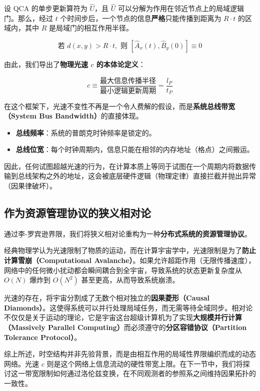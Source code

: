 设 QCA 的单步更新算符为 $\hat{U}$，且 $\hat{U}$ 可以分解为作用在邻近节点上的局域逻辑门。那么，经过 $t$ 个时间步后，一个节点的信息\textbf{严格}只能传播到距离为 $R \cdot t$ 的区域内，其中 $R$ 是局域门的相互作用半径。

\begin{equation}
\text{若 } d(x,y) > R \cdot t, \text{ 则 } [\hat{A}_x(t), \hat{B}_y(0)] \equiv 0
\end{equation}

由此，我们导出了\textbf{物理光速 $c$ 的本体论定义}：

\begin{equation}
c \equiv \frac{\text{最大信息传播半径}}{\text{最小逻辑更新周期}} = \frac{l_P}{t_P}
\end{equation}

在这个框架下，光速不变性不再是一个令人费解的假设，而是\textbf{系统总线带宽（System Bus Bandwidth）}的直接体现。

\begin{itemize}
\item \textbf{总线频率}：系统的普朗克时钟频率是锁定的。

\item \textbf{总线位宽}：每个时钟周期内，信息只能在相邻的内存地址（格点）之间搬运。
\end{itemize}

因此，任何试图超越光速的行为，在计算本质上等同于试图在一个周期内将数据传输到总线架构之外的地址，这会被底层硬件逻辑（物理定律）直接拦截并抛出异常（因果律破坏）。

\subsection{作为资源管理协议的狭义相对论}

通过李-罗宾逊界限，我们将狭义相对论重构为一种\textbf{分布式系统的资源管理协议}。

经典物理学认为光速限制了物质的运动，而在计算宇宙学中，光速限制是为了\textbf{防止计算雪崩（Computational Avalanche）}。如果允许超距作用（无限传播速度），网络中的任何微小扰动都会瞬间耦合到全宇宙，导致系统的状态更新复杂度从 $O(N)$ 爆炸到 $O(N^2)$ 甚至更高，从而导致系统崩溃。

\begin{corollary}[因果解耦]
光速的存在，将宇宙分割成了无数个相对独立的\textbf{因果菱形（Causal Diamonds）}。这使得系统可以并行处理局域任务，而无需等待全域同步。相对论不仅仅是关于运动的理论，它是宇宙这台超级计算机为了实现\textbf{大规模并行计算（Massively Parallel Computing）}而必须遵守的\textbf{分区容错协议（Partition Tolerance Protocol）}。
\end{corollary}

综上所述，时空结构并非先验背景，而是由相互作用的局域性界限编织而成的动态网络。光速 $c$ 则是这个网络上信息流动的硬性带宽上限。在下一节中，我们将探讨这一带宽限制如何通过洛伦兹变换，在不同观测者的参照系之间维持因果拓扑的一致性。
